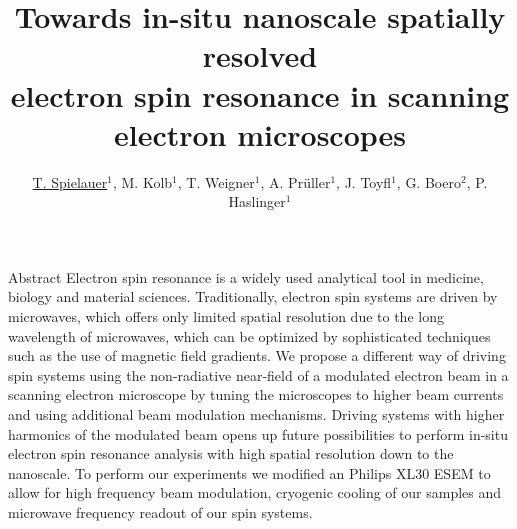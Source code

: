 \documentclass[final]{beamer}
\title{Towards in-situ nanoscale spatially resolved\hspace{1cm} \\ electron spin resonance in scanning electron microscopes}
\author{\underline{T. Spielauer$^{1}$}, M. Kolb$^{1}$, T. Weigner$^{1}$, A. Pr\"uller$^{1}$, J. Toyfl$^{1}$, G. Boero$^{2}$, P. Haslinger$^{1}$ }
\institute[]{
  {\small
  $^{1}$VCQ, Technische Universität Wien, Atominstitut, Stadionallee 2, 1020 Vienna, Austria; $^{2}$EPFL, BM 3110 Station 17, CH-1015 Lausanne, Switzerland
  }
}
\begin{document}
\begin{frame}[fragile]{}
  \begin{block}{\Large Abstract}
	Electron spin resonance is a widely used analytical tool in medicine, biology
	and material sciences. Traditionally, electron spin systems are driven by microwaves,
	which offers only limited spatial resolution due to the long wavelength of microwaves,
	which can be optimized by sophisticated techniques such as the use of magnetic
	field gradients. We propose a different way of driving spin systems using the
	non-radiative near-field of a modulated electron beam in a scanning electron microscope
	by tuning the microscopes to higher beam currents and using additional beam modulation
	mechanisms. Driving systems with higher harmonics of the modulated beam opens up
	future possibilities to perform in-situ electron spin resonance analysis with high
	spatial resolution down to the nanoscale. To perform our experiments we modified an
	Philips XL30 ESEM to allow for high frequency beam modulation, cryogenic cooling
	of our samples and microwave frequency readout of our spin systems.
  \end{block}
  \begin{columns}[T]
    \begin{column}{.49\linewidth}
%
%

\end{column}
\end{columns}
\end{frame}
\end{document}
